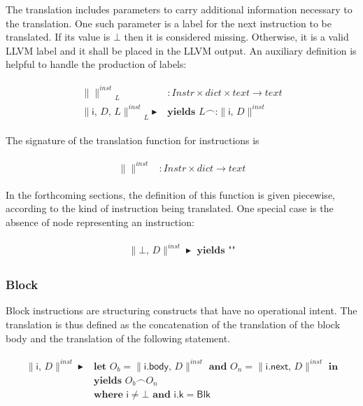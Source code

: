 \documentclass{article}
\newcommand{\trad}[2]{\ensuremath{\lVert \textsf{#1} \rVert^{\textit{#2}}}}
\DeclareMathOperator{\conc}{\smallfrown}
\DeclareMathOperator{\isdef}{\blacktriangleright}
\begin{document}
The translation includes parameters to carry additional information
necessary to the translation. One such parameter is a label for the
next instruction to be translated. If its value is $\bot$ then it is
considered missing. Otherwise, it is a valid LLVM label and it shall
be placed in the LLVM output. An auxiliary definition is helpful to
handle the production of labels:
\begin{framed}
\begin{align}
\begin{split}
  \trad{}{inst}_{L} &: Instr \times dict \times text \rightarrow text \\
  \trad{i, $D$, $L$}{inst}_L \isdef 
  & \textbf{yields } L \conc \texttt{:} \trad{i, $D$}{inst}  
\end{split}
\end{align}
\end{framed}

The signature of the translation function for instructions is
\begin{framed}
  \begin{align}
\begin{split}
    \trad{}{inst} &: Instr \times dict \rightarrow text
  \end{split}
\end{align}
\end{framed}
In the forthcoming sections, the definition of this function is given
piecewise, according to the kind of instruction being translated. One
special case is the absence of node representing an instruction:
\begin{framed}
  \begin{align}
\begin{split}
    \trad{$\bot$, $D$}{inst} \isdef \textbf{ yields } \texttt{""}
  \end{split}
\end{align}
\end{framed}
 
\subsubsection{Block}

Block instructions are structuring constructs that have no operational
intent. The translation is thus defined as the concatenation of the
translation of the block body and the translation of the following
statement.

\begin{framed}
\begin{align}
\begin{split}
  \trad{i, $D$}{inst} \isdef 
  & \textbf{let } O_b = \trad{i.body, $D$}{inst} 
  \textbf{ and } O_n = \trad{i.next, $D$}{inst} \textbf{ in} \\
  & \textbf{yields } O_b \conc O_n  \\
  & \textbf{where } \textsf{i} \ne \bot \textbf{ and } \textsf{i.k} = \textsf{Blk} 
\end{split}
\end{align}
\end{framed}
\end{document}
